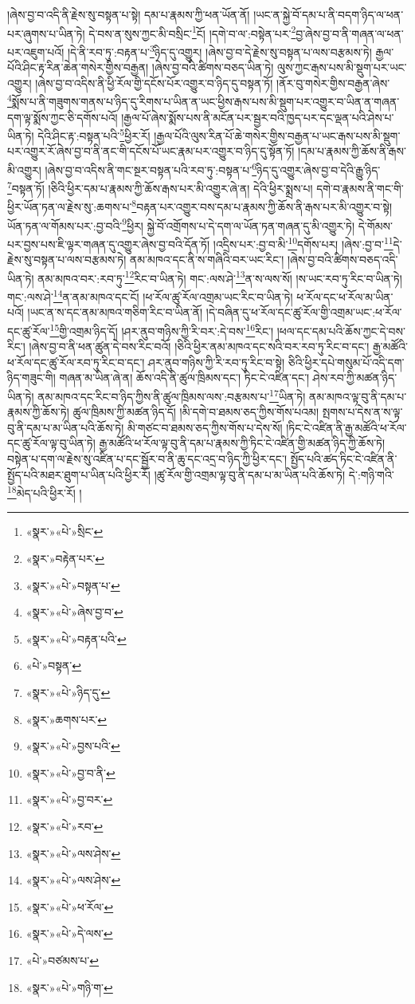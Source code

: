 །ཞེས་བྱ་བ་འདི་ནི་རྗེས་སུ་བསྟན་པ་སྟེ། དམ་པ་རྣམས་ཀྱི་ཕན་ཡོན་ནོ། །ཡང་ན་སྐྱེ་བོ་དམ་པ་ནི་བདག་ཉིད་ལ་ཕན་པར་ཞུགས་པ་ཡིན་ཏེ། དེ་བས་ན་སུས་ཀྱང་མི་བསྲིང་\footnote{«སྣར་»«པེ་»སྲིང་}ངོ། །དགེ་བ་ལ་:བསྟེན་པར་\footnote{«སྣར་»བརྟེན་པར་}བྱ་ཞེས་བྱ་བ་ནི་གཞན་ལ་ཕན་པར་འཇུག་པའོ། །དེ་ནི་རབ་ཏུ་:བརྟན་པ་\footnote{«སྣར་»«པེ་»བསྟན་པ་}ཉིད་དུ་འགྱུར། །ཞེས་བྱ་བ་དེ་རྗེས་སུ་བསྟན་པ་ལས་བརྩམས་ཏེ། རྒྱལ་པོའི་ཤིང་རྟ་རིན་ཆེན་གསེར་གྱིས་བརྒྱན། །ཞེས་བྱ་བའི་ཚིགས་བཅད་ཡིན་ཏེ། ལུས་ཀྱང་རྒས་པས་མི་སྡུག་པར་ཡང་འགྱུར། །ཞེས་བྱ་བ་འདིས་ནི་ཕྱི་རོལ་གྱི་དངོས་པོར་འགྱུར་བ་ཉིད་དུ་བསྟན་ཏོ། །ནོར་བུ་གསེར་གྱིས་བརྒྱན་ཞེས་\footnote{«སྣར་»«པེ་»ཞེས་བྱ་བ་}སྨོས་པ་ནི་གཟུགས་གནས་པ་ཉིད་དུ་རིགས་པ་ཡིན་ན་ཡང་ཕྱིས་རྒས་པས་མི་སྡུག་པར་འགྱུར་བ་ཡིན་ན་གཞན་དག་ལྟ་སྨོས་ཀྱང་ཅི་དགོས་པའོ། །རྒྱལ་པོ་ཞེས་སྨོས་པས་ནི་མངོན་པར་སྦྱར་བའི་ཁྱད་པར་དང་ལྡན་པའི་ཤེས་པ་ཡིན་ཏེ། དེའི་ཤིང་རྟ་:བསྟན་པའི་\footnote{«སྣར་»«པེ་»བརྟན་པའི་}ཕྱིར་རོ། །རྒྱལ་པོའི་ལུས་རིན་པོ་ཆེ་གསེར་གྱིས་བརྒྱན་པ་ཡང་རྒས་པས་མི་སྡུག་པར་འགྱུར་རོ་ཞེས་བྱ་བ་ནི་ནང་གི་དངོས་པོ་ཡང་རྣམ་པར་འགྱུར་བ་ཉིད་དུ་སྟོན་ཏོ། །དམ་པ་རྣམས་ཀྱི་ཆོས་ནི་རྒས་མི་འགྱུར། །ཞེས་བྱ་བ་འདིས་ནི་གང་སྔར་བསྟན་པའི་རབ་ཏུ་:བསྟན་པ་\footnote{«པེ་»བསྟན་}ཉིད་དུ་འགྱུར་ཞེས་བྱ་བ་དེའི་རྒྱུ་ཉིད་\footnote{«སྣར་»«པེ་»ཉིད་དུ་}བསྟན་ཏོ། །ཅིའི་ཕྱིར་དམ་པ་རྣམས་ཀྱི་ཆོས་རྒས་པར་མི་འགྱུར་ཞེ་ན། དེའི་ཕྱིར་སྨྲས་པ། དགེ་བ་རྣམས་ནི་གང་གི་ཕྱིར་ཡོན་ཏན་ལ་རྗེས་སུ་:ཆགས་པ་\footnote{«སྣར་»ཆགས་པར་}བརྟན་པར་འགྱུར་བས་དམ་པ་རྣམས་ཀྱི་ཆོས་ནི་རྒས་པར་མི་འགྱུར་བ་སྟེ། ཡོན་ཏན་ལ་གོམས་པར་:བྱ་བའི་\footnote{«སྣར་»«པེ་»བྱས་པའི་}ཕྱིར། སྐྱེ་བོ་འགྲོགས་པ་དེ་དག་ལ་ཡོན་ཏན་གཞན་དུ་མི་འགྱུར་ཏེ། དེ་གོམས་པར་བྱས་པས་ཇི་ལྟར་གཞན་དུ་འགྱུར་ཞེས་བྱ་བའི་དོན་ཏོ། །འདྲིས་པར་:བྱ་བ་མི་\footnote{«སྣར་»«པེ་»བྱ་བ་ནི་}དགོས་པར། །ཞེས་:བྱ་བ་\footnote{«སྣར་»«པེ་»བྱ་བར་}དེ་རྗེས་སུ་བསྟན་པ་ལས་བརྩམས་ཏེ། ནམ་མཁའ་དང་ནི་ས་གཞིའི་བར་ཡང་རིང་། །ཞེས་བྱ་བའི་ཚིགས་བཅད་འདི་ཡིན་ཏེ། ནམ་མཁའ་བར་:རབ་ཏུ་\footnote{«སྣར་»«པེ་»རབ་}རིང་བ་ཡིན་ཏེ། གང་:ལས་ཤེ་\footnote{«སྣར་»«པེ་»ལས་ཤེས་}ན་ས་ལས་སོ། །ས་ཡང་རབ་ཏུ་རིང་བ་ཡིན་ཏེ། གང་:ལས་ཤེ་\footnote{«སྣར་»«པེ་»ལས་ཤེས་}ན་ནམ་མཁའ་དང་ངོ། །ཕ་རོལ་ཚུ་རོལ་འགྲམ་ཡང་རིང་བ་ཡིན་ཏེ། ཕ་རོལ་དང་ཕ་རོལ་མ་ཡིན་པའོ། །ཡང་ན་ས་དང་ནམ་མཁའ་གཅིག་རིང་བ་ཡིན་ནོ། །དེ་བཞིན་དུ་ཕ་རོལ་དང་ཚུ་རོལ་གྱི་འགྲམ་ཡང་:ཕ་རོལ་དང་ཚུ་རོལ་\footnote{«སྣར་»«པེ་»ཕ་རོལ་}གྱི་འགྲམ་ཉིད་དོ། །ཤར་ནུབ་གཉིས་ཀྱི་རི་བར་:དེ་བས་\footnote{«སྣར་»«པེ་»དེ་ལས་}རིང་། །ཕལ་དང་དམ་པའི་ཆོས་ཀྱང་དེ་བས་རིང་། །ཞེས་བྱ་བ་ནི་ཕན་ཚུན་དེ་བས་རིང་བའོ། །ཅིའི་ཕྱིར་ནམ་མཁའ་དང་སའི་བར་རབ་ཏུ་རིང་བ་དང་། རྒྱ་མཚོའི་ཕ་རོལ་དང་ཚུ་རོལ་རབ་ཏུ་རིང་བ་དང་། ཤར་ནུབ་གཉིས་ཀྱི་རི་རབ་ཏུ་རིང་བ་སྟེ། ཅིའི་ཕྱིར་དཔེ་གསུམ་པོ་འདི་དག་ཉིད་གཟུང་གི། གཞན་མ་ཡིན་ཞེ་ན། ཆོས་འདི་ནི་ཚུལ་ཁྲིམས་དང་། ཏིང་ངེ་འཛིན་དང་། ཤེས་རབ་ཀྱི་མཚན་ཉིད་ཡིན་ཏེ། ནམ་མཁའ་དང་རིང་བ་ཉིད་ཀྱིས་ནི་ཚུལ་ཁྲིམས་ལས་:བརྩམས་པ་\footnote{«པེ་»བཙམས་པ་}ཡིན་ཏེ། ནམ་མཁའ་ལྟ་བུ་ནི་དམ་པ་རྣམས་ཀྱི་ཆོས་ཏེ། ཚུལ་ཁྲིམས་ཀྱི་མཚན་ཉིད་དོ། །མི་དགེ་བ་ཐམས་ཅད་ཀྱིས་གོས་པའམ། སྤགས་པ་དེས་ན་ས་ལྟ་བུ་ནི་དམ་པ་མ་ཡིན་པའི་ཆོས་ཏེ། མི་གཙང་བ་ཐམས་ཅད་ཀྱིས་གོས་པ་དེས་སོ། །ཏིང་ངེ་འཛིན་ནི་རྒྱ་མཚོའི་ཕ་རོལ་དང་ཚུ་རོལ་ལྟ་བུ་ཡིན་ཏེ། རྒྱ་མཚོའི་ཕ་རོལ་ལྟ་བུ་ནི་དམ་པ་རྣམས་ཀྱི་ཏིང་ངེ་འཛིན་གྱི་མཚན་ཉིད་ཀྱི་ཆོས་ཏེ། བསྟེན་པ་དག་ལ་རྗེས་སུ་འཛིན་པ་དང་སྦྱོར་བ་ནི་ཆུ་དང་འདྲ་བ་ཉིད་ཀྱི་ཕྱིར་དང་། སྤྱོད་པའི་ཚད་ཏིང་ངེ་འཛིན་ནི་སྤྱོད་པའི་མཐར་ཐུག་པ་ཡིན་པའི་ཕྱིར་རོ། །ཚུ་རོལ་གྱི་འགྲམ་ལྟ་བུ་ནི་དམ་པ་མ་ཡིན་པའི་ཆོས་ཏེ། དེ་:གཉི་གའི་\footnote{«སྣར་»«པེ་»གཉི་ག་}མེད་པའི་ཕྱིར་རོ། །
